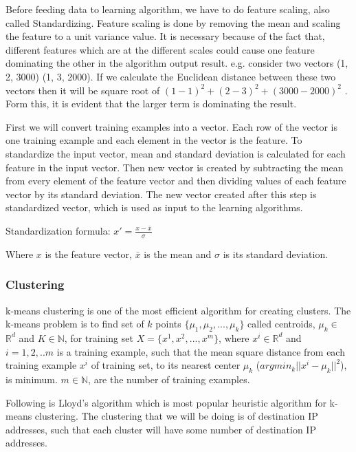 \documentclass[10pt,oneside,a4paper]{article}
\begin{document}
Before feeding data to learning algorithm, we have to do feature scaling, also called Standardizing. Feature scaling is done by removing the mean and scaling the feature to a unit variance value. It is necessary because of the fact that, different features which are at the different scales could cause one feature dominating the other in the algorithm output result. e.g. consider two vectors (1, 2, 3000) (1, 3, 2000). If we calculate the Euclidean distance between these two vectors then it will be square root of $(1-1)^2 + (2-3)^2 + (3000-2000)^2$ . Form this, it is evident that the larger term is dominating the result.

First we will convert training examples into a vector. Each row of the vector is one training example and each element in the vector is the feature. To standardize the input vector, mean and standard deviation is calculated for each feature in the input vector. Then new vector is created by subtracting the mean from every element of the feature vector and then dividing values of each feature vector by its standard deviation. The new vector created after this step is standardized vector, which is used as input to the learning algorithms.

\hspace{2cm} Standardization formula: $x' = \frac{x - \bar{x}}{\sigma}$

Where $x$ is the feature vector, ${\bar{x}}$ is the mean and $\sigma$  is its standard deviation.

\subsubsection{Clustering}

k-means clustering is one of the most efficient algorithm for creating clusters. The k-means problem is to find set of $k$ points $\{\mu_{1}, \mu_{2}, ..., \mu_{k}\}$ called centroids, $\mu_{k}\in$ $\mathbb{R}^d$ and $K \in \mathbb{N}$, for training set $X = \{x^{1}, x^{2}, ..., x^{m}\}$, where $x^{i} \in \mathbb{R}^d$
and $i= {1,2, ..m}$ is a training example, such that the mean square distance from each training example $x^{i}$ of training set, to its nearest center $\mu_{k}$ ($argmin_{k} || x^{i} {-} \mu_{k} ||^{2}$), is minimum. $m \in \mathbb{N}$, are the number of training examples.\cite{k-means-clustering}

Following is Lloyd's algorithm  which is most popular heuristic algorithm for k-means clustering. The clustering that we will be doing is of destination IP addresses, such that each cluster will have some number of destination IP addresses.
\end{document}

